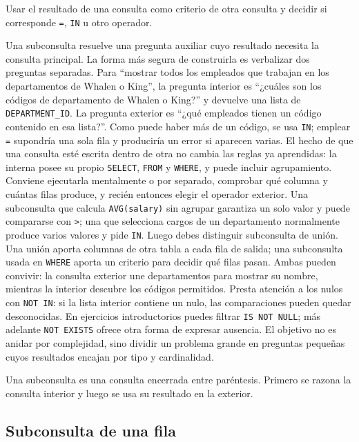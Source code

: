\documentclass[11pt,a4paper]{article}
\newcommand{\campo}[1]{\texttt{#1}}
\begin{document}
\begin{objetivo}
Usar el resultado de una consulta como criterio de otra consulta y decidir si corresponde
\campo{=}, \campo{IN} u otro operador.
\end{objetivo}

Una subconsulta resuelve una pregunta auxiliar cuyo resultado necesita la consulta principal. La
forma más segura de construirla es verbalizar dos preguntas separadas. Para ``mostrar todos los
empleados que trabajan en los departamentos de Whalen o King'', la pregunta interior es ``¿cuáles son
los códigos de departamento de Whalen o King?'' y devuelve una lista de
\campo{DEPARTMENT_ID}. La pregunta exterior es ``¿qué empleados tienen un código contenido en esa
lista?''. Como puede haber más de un código, se usa \campo{IN}; emplear \campo{=} supondría una sola
fila y produciría un error si aparecen varias. El hecho de que una consulta esté escrita dentro de
otra no cambia las reglas ya aprendidas: la interna posee su propio \campo{SELECT}, \campo{FROM} y
\campo{WHERE}, y puede incluir agrupamiento. Conviene ejecutarla mentalmente o por separado, comprobar
qué columna y cuántas filas produce, y recién entonces elegir el operador exterior. Una subconsulta
que calcula \campo{AVG(salary)} sin agrupar garantiza un solo valor y puede compararse con
\campo{>}; una que selecciona cargos de un departamento normalmente produce varios valores y pide
\campo{IN}. Luego debes distinguir subconsulta de unión. Una unión aporta columnas de otra tabla a
cada fila de salida; una subconsulta usada en \campo{WHERE} aporta un criterio para decidir qué filas
pasan. Ambas pueden convivir: la consulta exterior une departamentos para mostrar su nombre, mientras
la interior descubre los códigos permitidos. Presta atención a los nulos con \campo{NOT IN}: si la
lista interior contiene un nulo, las comparaciones pueden quedar desconocidas. En ejercicios
introductorios puedes filtrar \campo{IS NOT NULL}; más adelante \campo{NOT EXISTS} ofrece otra forma
de expresar ausencia. El objetivo no es anidar por complejidad, sino dividir un problema grande en
preguntas pequeñas cuyos resultados encajan por tipo y cardinalidad.

Una subconsulta es una consulta encerrada entre paréntesis. Primero se razona la consulta interior y
luego se usa su resultado en la exterior.

\subsection{Subconsulta de una fila}
\end{document}
